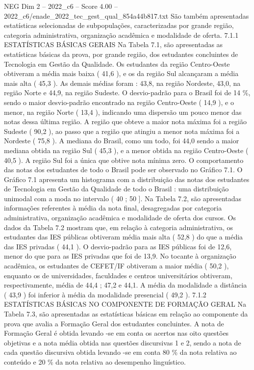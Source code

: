 \begin{textsample}{NEG Dim 2 – 2022\_c6 – Score 4.00 – 2022\_c6/enade\_2022\_tec\_gest\_qual\_854a44b817.txt}
São também apresentadas estatísticas selecionadas de subpopulações, caracterizadas por grande região, categoria administrativa, organização acadêmica e modalidade de oferta. 7.1.1 ESTATÍSTICAS BÁSICAS GERAIS Na Tabela 7.1, são apresentadas as estatísticas básicas da prova, por grande região, dos estudantes concluintes de Tecnologia em Gestão da Qualidade.
Os estudantes da região Centro-Oeste obtiveram a média mais baixa ( 41,6 ), e os da região Sul alcançaram a média mais alta ( 45,3 ).
As demais médias foram : 43,8, na região Nordeste, 43,0, na região Norte e 44,9, na região Sudeste.
O desvio-padrão para o Brasil foi de 14 \%, sendo o maior desvio-padrão encontrado na região Centro-Oeste ( 14,9 ), e o menor, na região Norte ( 13,4 ), indicando uma dispersão um pouco menor das notas dessa última região.
A região que obteve a maior nota máxima foi a região Sudeste ( 90,2 ), ao passo que a região que atingiu a menor nota máxima foi a Nordeste ( 75,8 ).
A mediana do Brasil, como um todo, foi 44,0 sendo a maior mediana obtida na região Sul ( 45,3 ), e a menor obtida na região Centro-Oeste ( 40,5 ).
A região Sul foi a única que obtive nota mínima zero.
O comportamento das notas dos estudantes de todo o Brasil pode ser observado no Gráfico 7.1.
O Gráfico 7.1 apresenta um histograma com a distribuição das notas dos estudantes de Tecnologia em Gestão da Qualidade de todo o Brasil : uma distribuição unimodal com a moda no intervalo ( 40 ; 50 ].
Na Tabela 7.2, são apresentadas informações referentes à média da nota final, desagregadas por categoria administrativa, organização acadêmica e modalidade de oferta dos cursos.
Os dados da Tabela 7.2 mostram que, em relação à categoria administrativa, os estudantes das IES públicas obtiveram média mais alta ( 52,8 ) do que a média das IES privadas ( 44,1 ).
O desvio-padrão para as IES públicas foi de 12,6, menor do que para as IES privadas que foi de 13,9.
No tocante à organização acadêmica, os estudantes de CEFET/IF obtiveram a maior média ( 50,2 ), enquanto os de universidades, faculdades e centros universitários obtiveram, respectivamente, média de 44,4 ; 47,2 e 44,1.
A média da modalidade a distância ( 43,9 ) foi inferior à média da modalidade presencial ( 49,2 ). 7.1.2 ESTATÍSTICAS BÁSICAS NO COMPONENTE DE FORMAÇÃO GERAL Na Tabela 7.3, são apresentadas as estatísticas básicas em relação ao componente da prova que avalia a Formação Geral dos estudantes concluintes.
A nota de Formação Geral é obtida levando -se em conta os acertos nas oito questões objetivas e a nota média obtida nas questões discursivas 1 e 2, sendo a nota de cada questão discursiva obtida levando -se em conta 80 \% da nota relativa ao conteúdo e 20 \% da nota relativa ao desempenho linguístico.

\end{textsample}
